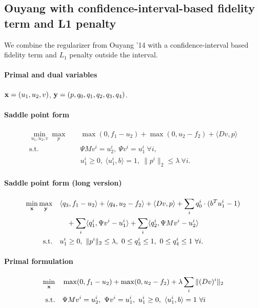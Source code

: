 
\subsection{Ouyang with confidence-interval-based fidelity term and L1 penalty}

We combine the regularizer from Ouyang '14 with a confidence-interval based
fidelity term and $L_1$ penalty outside the interval.

\paragraph{Primal and dual variables}
$\mathbf{x} = (u_1,u_2,v)$, $\mathbf{y} = (p,q_0,q_1,q_2,q_3,q_4)$.

\paragraph{Saddle point form}
\begin{align*}
    \min_{u_1,u_2,v} \max_{p} \quad
        & \max(0, f_1 - u_2) + \max(0, u_2 - f_2) + \langle Dv, p \rangle \\
    \text{s.t.}\quad
        & \Psi M v^i = u_2^i, ~\Psi v^i = u_1^i ~\forall i, \\
        & u_1^i \geq 0, ~\langle u_1^i, b \rangle = 1,
          ~\|p^{i}\|_{2} \leq \lambda ~\forall i.
\end{align*}

\paragraph{Saddle point form (long version)}
\begin{align*}
    \min_{\mathbf{x}} \max_{\mathbf{y}} \quad
        & \langle q_3, f_1 - u_2 \rangle + \langle q_4, u_2 - f_2 \rangle
            + \langle Dv, p \rangle
            + \sum_{i} q_0^i \cdot (b^T u_1^i - 1) \\
        &\quad + \sum_{i} \langle q_1^i, \Psi v^i - u_1^i \rangle
            + \sum_{i} \langle q_2^i, \Psi M v^i - u_2^i \rangle \\
    \text{s.t.}\quad
        & u_1^i \geq 0, ~\|p^{i}\|_{2} \leq \lambda,
          ~0 \leq q_3^i \leq 1, ~0 \leq q_4^i \leq 1 ~\forall i.
\end{align*}

\paragraph{Primal formulation}
\begin{align*}
    \min_{\mathbf{x}} \quad
        & \max(0, f_1 - u_2) + \max(0, u_2 - f_2)
            + \lambda \sum_{i} \| (D v)^{i} \|_{2} \\
    \text{s.t.}\quad
        & \Psi M v^i = u_2^i, ~\Psi v^i = u_1^i,
          ~u_1^i \geq 0, ~\langle u_1^i, b \rangle = 1 ~\forall i
\end{align*}

